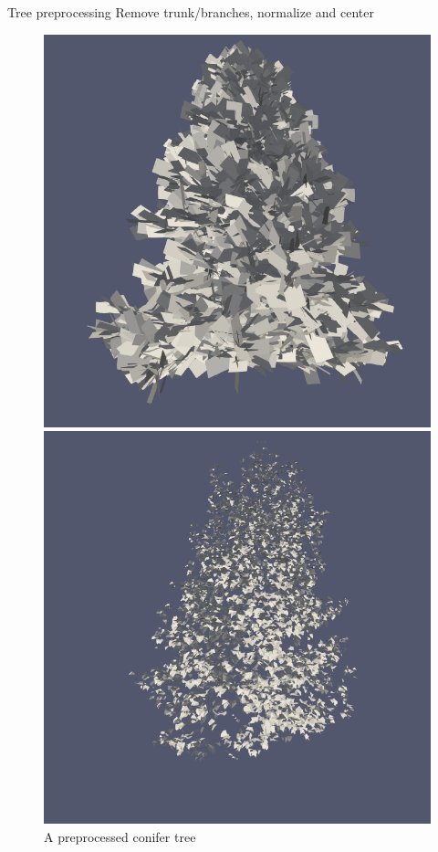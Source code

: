 \documentclass[10pt]{beamer}
\begin{document}
\begin{frame}{Tree preprocessing}
	Remove trunk/branches, normalize and center
	\begin{figure}[h]
		\centering
		\begin{minipage}{0.3\textwidth}
			\centering
			\includegraphics[width=\textwidth]{images/tree-conifer.png}
			\caption{A preprocessed conifer tree}
			\label{fig:figure1}
		\end{minipage}\hfill
		\begin{minipage}{0.3\textwidth}
			\centering
			\includegraphics[width=\textwidth]{images/tree-ginkgo.png}

\end{minipage}
\end{figure}
\end{frame}
\end{document}
